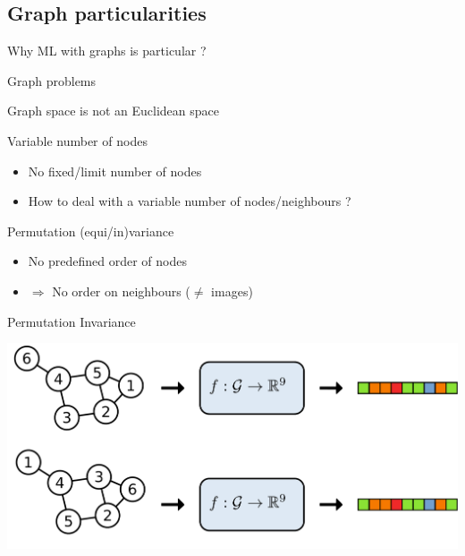 \documentclass[11pt]{beamer}
\begin{document}
\subsection{Graph particularities}

\begin{frame}
  \begin{center}
    \huge {Why ML with graphs is particular ? }
  \end{center}

\end{frame}
\begin{frame}{Graph problems}
  \begin{center}
      \large{Graph space is not an Euclidean space}
    
  \end{center}

  \begin{block}{Variable number of nodes}
    \begin{itemize}
    \item No fixed/limit number of nodes
    \item How to deal with a variable number of nodes/neighbours ? 
    \end{itemize}
  \end{block}

  \begin{block}{Permutation (equi/in)variance}
    \begin{itemize}
    \item No predefined order of nodes
    \item $\Rightarrow$ No order on neighbours ($\neq$ images)
    \end{itemize}
  \end{block}
  
\end{frame}


\begin{frame}{Permutation Invariance}
  \begin{center}
    \includegraphics[width=\textwidth]{invariant}
  \end{center}
\end{frame}
\end{document}
